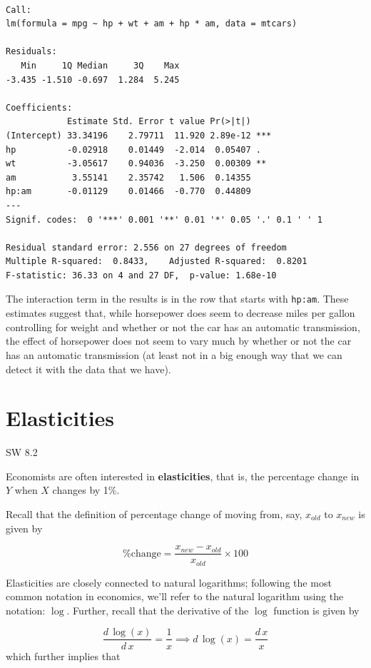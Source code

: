 \documentclass[
  letterpaper,
  DIV=11,
  numbers=noendperiod]{scrreprt}
\begin{document}
\begin{verbatim}

Call:
lm(formula = mpg ~ hp + wt + am + hp * am, data = mtcars)

Residuals:
   Min     1Q Median     3Q    Max 
-3.435 -1.510 -0.697  1.284  5.245 

Coefficients:
            Estimate Std. Error t value Pr(>|t|)    
(Intercept) 33.34196    2.79711  11.920 2.89e-12 ***
hp          -0.02918    0.01449  -2.014  0.05407 .  
wt          -3.05617    0.94036  -3.250  0.00309 ** 
am           3.55141    2.35742   1.506  0.14355    
hp:am       -0.01129    0.01466  -0.770  0.44809    
---
Signif. codes:  0 '***' 0.001 '**' 0.01 '*' 0.05 '.' 0.1 ' ' 1

Residual standard error: 2.556 on 27 degrees of freedom
Multiple R-squared:  0.8433,    Adjusted R-squared:  0.8201 
F-statistic: 36.33 on 4 and 27 DF,  p-value: 1.68e-10
\end{verbatim}

The interaction term in the results is in the row that starts with
\texttt{hp:am}. These estimates suggest that, while horsepower does seem
to decrease miles per gallon controlling for weight and whether or not
the car has an automatic transmission, the effect of horsepower does not
seem to vary much by whether or not the car has an automatic
transmission (at least not in a big enough way that we can detect it
with the data that we have).

\section{Elasticities}\label{elasticities}

SW 8.2

Economists are often interested in \textbf{elasticities}, that is, the
percentage change in \(Y\) when \(X\) changes by 1\%.

Recall that the definition of percentage change of moving from, say,
\(x_{old}\) to \(x_{new}\) is given by

\[
  \textrm{\% change} = \frac{x_{new} - x_{old}}{x_{old}} \times 100
\]

Elasticities are closely connected to natural logarithms; following the
most common notation in economics, we'll refer to the natural logarithm
using the notation: \(\log\). Further, recall that the derivative of the
\(\log\) function is given by

\[
  \frac{d \, \log(x)}{d \, x} = \frac{1}{x} \implies d\, \log(x) = \frac{d \, x}{x}
\] which further implies that
\end{document}
